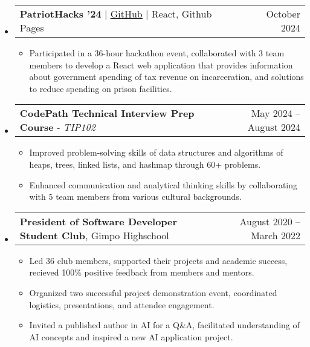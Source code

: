 \documentclass[letterpaper,11pt]{article}
\makeatletter
\newcommand{\resumeItem}[1]{
  \item\small{
    {#1 \vspace{-3pt}}
  }
}
\newcommand{\resumeProjectHeading}[2]{
    \item
    \begin{tabular*}{0.97\textwidth}{l@{\extracolsep{\fill}}r@{\hspace{-0.2in}}}
        \small#1 & \small#2 \\
    \end{tabular*}\vspace{-5pt}
}
\newcommand{\resumeSubHeadingListStart}{\begin{itemize}[leftmargin=0.00in, rightmargin=-0.2in, label={}]}
\newcommand{\resumeSubHeadingListEnd}{\end{itemize}\vspace{-7pt}}
\newcommand{\resumeItemListStart}{\begin{itemize}[leftmargin=0.15in, rightmargin=0.15in]}
\newcommand{\resumeItemListEnd}{\end{itemize}\vspace{-7pt}}
\makeatother
\begin{document}
\resumeSubHeadingListStart
\resumeProjectHeading
{\textbf{PatriotHacks '24} $|$ \href{https://github.com/juhun32/Prison-Break}{\underline{GitHub}} $|$ React, Github Pages}{October 2024}
\resumeItemListStart
\resumeItem{Participated in a 36-hour hackathon event, collaborated with 3 team members to develop a React web application that provides information about government spending of tax revenue on incarceration, and solutions to reduce spending on prison facilities.}
\resumeItemListEnd
\resumeSubHeadingListEnd

\resumeSubHeadingListStart
\resumeProjectHeading
{\textbf{CodePath Technical Interview Prep Course} - \emph{TIP102}}{May 2024 -- August 2024}
\resumeItemListStart
\resumeItem{Improved problem-solving skills of data structures and algorithms of heaps, trees, linked lists, and hashmap through 60+ problems.}
\resumeItem{Enhanced communication and analytical thinking skills by collaborating with 5 team members from various cultural backgrounds.}
\resumeItemListEnd
\resumeSubHeadingListEnd

\resumeSubHeadingListStart
\resumeProjectHeading
{\textbf{President of Software Developer Student Club}, Gimpo Highschool}{August 2020 -- March 2022}
\resumeItemListStart
\resumeItem{Led 36 club members, supported their projects and academic success, recieved 100\% positive feedback from members and mentors.}
\resumeItem{Organized two successful project demonstration event, coordinated logistics, presentations, and attendee engagement.}
\resumeItem{Invited a published author in AI for a Q\&A, facilitated understanding of AI concepts and inspired a new AI application project.}
\resumeItemListEnd
\resumeSubHeadingListEnd
\end{document}
